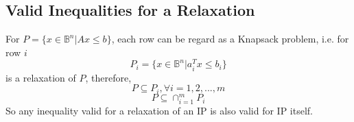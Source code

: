 			\subsection{Valid Inequalities for a Relaxation}
				For $P=\{x\in \mathbb{B}^n | Ax\le b\}$, each row can be regard as a Knapsack problem, i.e. for row $i$
				\begin{equation}
					P_i = \{x\in \mathbb{B}^n | a_i^T x \le b_i\} 
				\end{equation}
				is a relaxation of $P$, therefore,
				\begin{equation}
					P\subseteq P_i, \forall i=1,2,...,m 
				\end{equation}
				\begin{equation}
					P\subseteq \cap_{i=1}^m P_i 
				\end{equation}
				So any inequality valid for a relaxation of an IP is also valid for IP itself.
				
